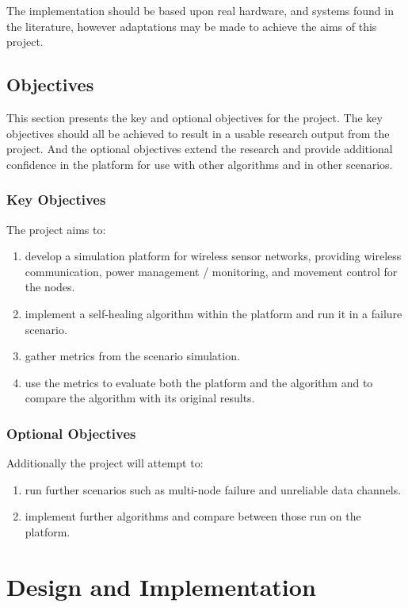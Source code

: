 \documentclass[authoryearcitations]{UoYCSproject}
\begin{document}
The implementation should be based upon real hardware, and systems found in the literature, however adaptations may be made to achieve the aims of this project.

\section{Objectives}
\label{sec:objectives}

This section presents the key and optional objectives for the project. The key objectives should all be achieved to result in a usable research output from the project. And the optional objectives extend the research and provide additional confidence in the platform for use with other algorithms and in other scenarios.

\subsection{Key Objectives}
The project aims to:
\begin{enumerate}
\item develop a simulation platform for wireless sensor networks, providing wireless communication, power management / monitoring, and movement control for the nodes.
\item implement a self-healing algorithm within the platform and run it in a failure scenario.
\item gather metrics from the scenario simulation.
\item use the metrics to evaluate both the platform and the algorithm and to compare the algorithm with its original results.
\end{enumerate}

\subsection{Optional Objectives}
Additionally the project will attempt to:
\begin{enumerate}
\item run further scenarios such as multi-node failure and unreliable data channels.
\item implement further algorithms and compare between those run on the platform.
\end{enumerate}

\chapter{Design and Implementation}
\label{cha:Design}
\end{document}

